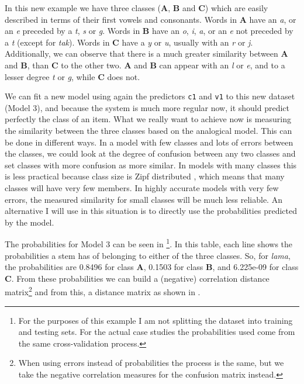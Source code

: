 In this new example we have three classes (\textbf{A}, \textbf{B} and \textbf{C}) which are easily described in terms of their first vowels and consonants. Words in \textbf{A} have an \textit{a}, or an \textit{e} preceded by a \textit{t}, \textit{s} or \textit{g}. Words in \textbf{B} have an \textit{o}, \textit{i}, \textit{a}, or an \textit{e} not preceded by a \textit{t} (except for \textit{tak}). Words in \textbf{C} have a \textit{y} or \textit{u}, usually with an \textit{r} or \textit{j}. Additionally, we can observe that there is a much greater similarity between \textbf{A} and \textbf{B}, than \textbf{C} to the other two. \textbf{A} and \textbf{B} can appear with an \textit{l} or \textit{e}, and to a lesser degree \textit{t} or \textit{g}, while \textbf{C} does not.

We can fit a new model using again the predictors \texttt{c1} and \texttt{v1} to this new dataset (Model 3), and because the system is much more regular now, it should predict perfectly the class of an item. What we really want to achieve now is measuring the similarity between the three classes based on the analogical model. This can be done in different ways. In a model with few classes and lots of errors between the classes, we could look at the degree of confusion between any two classes and set classes with more confusion as more similar. In models with many classes this is less practical because class size is Zipf distributed \autocite{Blevins.2016}, which means that many classes will have very few members. In highly accurate models with very few errors, the measured similarity for small classes will be much less reliable. An alternative I will use in this situation is to directly use the probabilities predicted by the model.

The probabilities for Model 3 can be seen in \footnote{For the purposes of this example I am not splitting the dataset into training and testing sets. For the actual case studies the probabilities used come from the same cross-validation process.}. In this table, each line shows the probabilities a stem has of belonging to either of the three classes. So, for \textit{lama}, the probabilities are 0.8496 for class \textbf{A}, 0.1503 for class \textbf{B}, and 6.225e-09 for class \textbf{C}. From these probabilities we can build a (negative) correlation distance matrix\footnote{When using errors instead of probabilities the process is the same, but we take the negative correlation measures for the confusion matrix instead.} and from this, a distance matrix as shown in .

